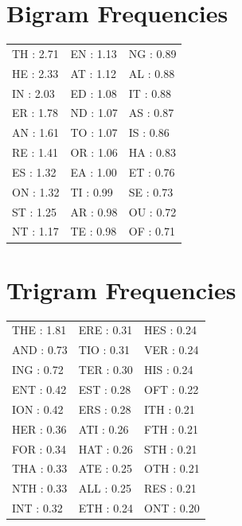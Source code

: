 \documentclass{article}
\begin{document}

\section*{Bigram Frequencies}
\begin{tabular}{lll}
TH : 2.71 & EN : 1.13 & NG : 0.89 \\
HE : 2.33 & AT : 1.12 & AL : 0.88 \\
IN : 2.03 & ED : 1.08 & IT : 0.88 \\
ER : 1.78 & ND : 1.07 & AS : 0.87 \\
AN : 1.61 & TO : 1.07 & IS : 0.86 \\
RE : 1.41 & OR : 1.06 & HA : 0.83 \\
ES : 1.32 & EA : 1.00 & ET : 0.76 \\
ON : 1.32 & TI : 0.99 & SE : 0.73 \\
ST : 1.25 & AR : 0.98 & OU : 0.72 \\
NT : 1.17 & TE : 0.98 & OF : 0.71 \\
\end{tabular}

\vspace{10mm}

\section*{Trigram Frequencies}
\begin{tabular}{lll}
THE : 1.81 & ERE : 0.31 & HES : 0.24 \\
AND : 0.73 & TIO : 0.31 & VER : 0.24 \\
ING : 0.72 & TER : 0.30 & HIS : 0.24 \\
ENT : 0.42 & EST : 0.28 & OFT : 0.22 \\
ION : 0.42 & ERS : 0.28 & ITH : 0.21 \\
HER : 0.36 & ATI : 0.26 & FTH : 0.21 \\
FOR : 0.34 & HAT : 0.26 & STH : 0.21 \\
THA : 0.33 & ATE : 0.25 & OTH : 0.21 \\
NTH : 0.33 & ALL : 0.25 & RES : 0.21 \\
INT : 0.32 & ETH : 0.24 & ONT : 0.20 \\
\end{tabular}
\end{document}
